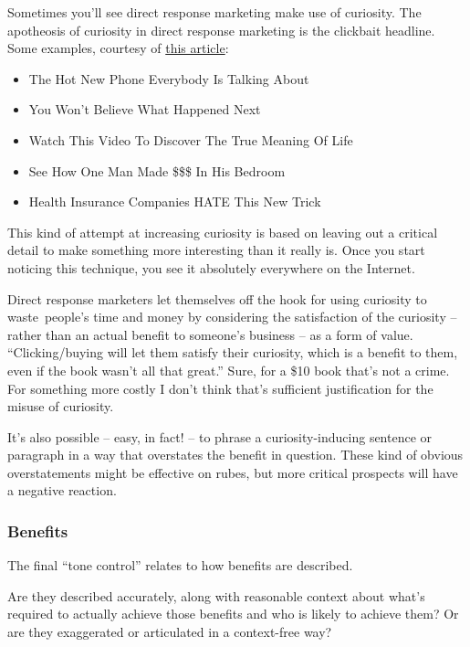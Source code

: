 \documentclass[13pt,]{tufte-handout}
\providecommand{\tightlist}{%
  \setlength{\itemsep}{0pt}\setlength{\parskip}{0pt}}
\begin{document}
Sometimes you'll see direct response marketing make use of curiosity.
The apotheosis of curiosity in direct response marketing is the
clickbait headline. Some examples, courtesy of
\href{https://www.makeuseof.com/tag/buzzworthy-5-clickbait-headlines-guaranteed-annoy-ask-results/}{this
article}:

\begin{itemize}
\tightlist
\item
  The Hot New Phone Everybody Is Talking About
\item
  You Won't Believe What Happened Next
\item
  Watch This Video To Discover The True Meaning Of Life
\item
  See How One Man Made \$\$\$ In His Bedroom
\item
  Health Insurance Companies HATE This New Trick
\end{itemize}

This kind of attempt at increasing curiosity is based on leaving out a
critical detail to make something more interesting than it really is.
Once you start noticing this technique, you see it absolutely everywhere
on the Internet.

Direct response marketers let themselves off the hook for using
curiosity to waste~people's time and money by considering the
satisfaction of the curiosity -- rather than an actual benefit to
someone's business -- as a form of value. ``Clicking/buying will let
them satisfy their curiosity, which is a benefit to them, even if the
book wasn't all that great.'' Sure, for a \$10 book that's not a crime.
For something more costly I don't think that's sufficient justification
for the misuse of curiosity.

It's also possible -- easy, in fact! -- to phrase a curiosity-inducing
sentence or paragraph in a way that overstates the benefit in question.
These kind of obvious overstatements might be effective on rubes, but
more critical prospects will have a negative reaction.

\hypertarget{benefits}{%
\subsubsection{Benefits}\label{benefits}}

The final ``tone control'' relates to how benefits are described.

Are they described accurately, along with reasonable context about
what's required to actually achieve those benefits and who is likely to
achieve them? Or are they exaggerated or articulated in a context-free
way?
\end{document}
